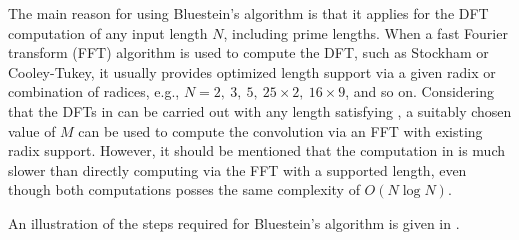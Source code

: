 \documentclass[11pt]{scrartcl}
\begin{document}
The main reason for using Bluestein's algorithm is that it applies for the DFT computation of any input length $N$, including prime lengths. When a fast Fourier transform (FFT) algorithm is used to compute the DFT, such as Stockham or Cooley-Tukey, it usually provides optimized length support via a given radix or combination of radices, e.g., $N = 2, \ 3, \ 5, \ 25 \times 2, \ 16 \times 9$, and so on. Considering that the DFTs in  can be carried out with any length satisfying , a suitably chosen value of $M$ can be used to compute the  convolution via an FFT with existing radix support. However, it should be mentioned that the computation in  is much slower than directly computing  via the FFT with a supported length, even though both computations posses the same complexity of $O(N \log N)$.

An illustration of the steps required for Bluestein's algorithm is given in . 
\end{document}
